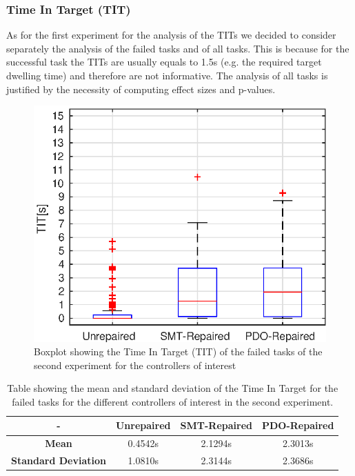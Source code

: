 \subsubsection{Time In Target (TIT)}\label{subsub:second-TIT}
As for the first experiment for the analysis of the TITs we decided to consider separately the analysis of the failed tasks and of all tasks. This is because for the successful task the TITs are usually equals to 1.5s (e.g. the required target dwelling time) and therefore are not informative. The analysis of all tasks is justified by the necessity of computing effect sizes and p-values.
\begin{figure}[H]
    \centering
    \includegraphics[width=\textwidth]{Images/second-experiment/exp1_TIT_fail.eps}
    \caption{Boxplot showing the Time In Target (TIT) of the failed tasks of the second experiment for the controllers of interest}
    \label{fig:box-TIT-fail-second}
\end{figure}
\begin{table}[H]
    \centering
    \begin{tabular}{|c|c|c|c|}
        \hline
        - & \textbf{Unrepaired} & \textbf{SMT-Repaired} & \textbf{PDO-Repaired} \\
        \hline
        \textbf{Mean} & 0.4542s & 2.1294s & 2.3013s \\
        \textbf{Standard Deviation} & 1.0810s & 2.3144s & 2.3686s \\
        \hline
    \end{tabular}
    \caption{Table showing the mean and standard deviation of the Time In Target for the failed tasks for the different controllers of interest in the second experiment.}
    \label{tab:TIT-fail-second-mean-std}
\end{table}
